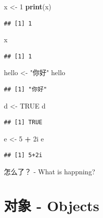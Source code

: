 \documentclass[]{book}
\newenvironment{Shaded}{\begin{snugshade}}{\end{snugshade}}
\newcommand{\DecValTok}[1]{\textcolor[rgb]{0.00,0.00,0.81}{#1}}
\newcommand{\KeywordTok}[1]{\textcolor[rgb]{0.13,0.29,0.53}{\textbf{#1}}}
\newcommand{\NormalTok}[1]{#1}
\newcommand{\OperatorTok}[1]{\textcolor[rgb]{0.81,0.36,0.00}{\textbf{#1}}}
\newcommand{\OtherTok}[1]{\textcolor[rgb]{0.56,0.35,0.01}{#1}}
\newcommand{\StringTok}[1]{\textcolor[rgb]{0.31,0.60,0.02}{#1}}
\begin{document}
\begin{Shaded}
\begin{Highlighting}[]
\NormalTok{x <-}\StringTok{ }\DecValTok{1}
\KeywordTok{print}\NormalTok{(x)}
\end{Highlighting}
\end{Shaded}

\begin{verbatim}
## [1] 1
\end{verbatim}

\begin{Shaded}
\begin{Highlighting}[]
\NormalTok{x}
\end{Highlighting}
\end{Shaded}

\begin{verbatim}
## [1] 1
\end{verbatim}

\begin{Shaded}
\begin{Highlighting}[]
\NormalTok{hello <-}\StringTok{ "你好"}
\NormalTok{hello}
\end{Highlighting}
\end{Shaded}

\begin{verbatim}
## [1] "你好"
\end{verbatim}

\begin{Shaded}
\begin{Highlighting}[]
\NormalTok{d <-}\StringTok{ }\OtherTok{TRUE}
\NormalTok{d}
\end{Highlighting}
\end{Shaded}

\begin{verbatim}
## [1] TRUE
\end{verbatim}

\begin{Shaded}
\begin{Highlighting}[]
\NormalTok{e <-}\StringTok{ }\DecValTok{5} \OperatorTok{+}\StringTok{ }\NormalTok{2i}
\NormalTok{e}
\end{Highlighting}
\end{Shaded}

\begin{verbatim}
## [1] 5+2i
\end{verbatim}

怎么了？ - What is happning?

\hypertarget{objects}{%
\section{对象 - Objects}\label{objects}}
\end{document}
